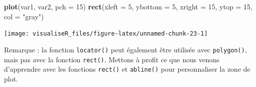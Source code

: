 \documentclass[]{article}
\newenvironment{Shaded}{\begin{snugshade}}{\end{snugshade}}
\newcommand{\DataTypeTok}[1]{\textcolor[rgb]{0.13,0.29,0.53}{#1}}
\newcommand{\DecValTok}[1]{\textcolor[rgb]{0.00,0.00,0.81}{#1}}
\newcommand{\KeywordTok}[1]{\textcolor[rgb]{0.13,0.29,0.53}{\textbf{#1}}}
\newcommand{\NormalTok}[1]{#1}
\newcommand{\StringTok}[1]{\textcolor[rgb]{0.31,0.60,0.02}{#1}}
\begin{document}
\begin{Shaded}
\begin{Highlighting}[]
\KeywordTok{plot}\NormalTok{(var1, var2, }\DataTypeTok{pch =} \DecValTok{15}\NormalTok{)}
\KeywordTok{rect}\NormalTok{(}\DataTypeTok{xleft =} \DecValTok{5}\NormalTok{, }\DataTypeTok{ybottom =} \DecValTok{5}\NormalTok{, }\DataTypeTok{xright =} \DecValTok{15}\NormalTok{, }\DataTypeTok{ytop =} \DecValTok{15}\NormalTok{, }\DataTypeTok{col =} \StringTok{"gray"}\NormalTok{)}
\end{Highlighting}
\end{Shaded}

\begin{center}\texttt{[image: visualiseR\_files/figure-latex/unnamed-chunk-23-1]} \end{center}

Remarque : la fonction \texttt{locator()} peut également être utilisée avec \texttt{polygon()}, mais pas avec la fonction \texttt{rect()}.
Mettons à profit ce que nous venons d'apprendre avec les fonctions \texttt{rect()} et \texttt{abline()} pour personnaliser la zone de plot.
\end{document}
